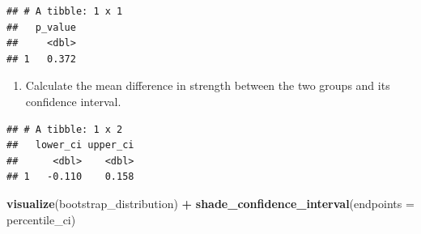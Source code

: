 \documentclass[
]{book}
\newenvironment{Shaded}{\begin{snugshade}}{\end{snugshade}}
\newcommand{\CommentTok}[1]{\textcolor[rgb]{0.56,0.35,0.01}{\textit{#1}}}
\newcommand{\DataTypeTok}[1]{\textcolor[rgb]{0.13,0.29,0.53}{#1}}
\newcommand{\DecValTok}[1]{\textcolor[rgb]{0.00,0.00,0.81}{#1}}
\newcommand{\FloatTok}[1]{\textcolor[rgb]{0.00,0.00,0.81}{#1}}
\newcommand{\KeywordTok}[1]{\textcolor[rgb]{0.13,0.29,0.53}{\textbf{#1}}}
\newcommand{\NormalTok}[1]{#1}
\newcommand{\OperatorTok}[1]{\textcolor[rgb]{0.81,0.36,0.00}{\textbf{#1}}}
\newcommand{\StringTok}[1]{\textcolor[rgb]{0.31,0.60,0.02}{#1}}
\providecommand{\tightlist}{%
  \setlength{\itemsep}{0pt}\setlength{\parskip}{0pt}}
\begin{document}
\begin{verbatim}
## # A tibble: 1 x 1
##   p_value
##     <dbl>
## 1   0.372
\end{verbatim}

\begin{enumerate}
\def\labelenumi{\arabic{enumi}.}
\setcounter{enumi}{3}
\tightlist
\item
  Calculate the mean difference in strength between the two groups and its confidence interval.
\end{enumerate}

\begin{Shaded}
\end{Shaded}

\begin{Shaded}
\end{Shaded}

\begin{verbatim}
## # A tibble: 1 x 2
##   lower_ci upper_ci
##      <dbl>    <dbl>
## 1   -0.110    0.158
\end{verbatim}

\begin{Shaded}
\begin{Highlighting}[]
\KeywordTok{visualize}\NormalTok{(bootstrap_distribution) }\OperatorTok{+}\StringTok{ }
\StringTok{  }\KeywordTok{shade_confidence_interval}\NormalTok{(}\DataTypeTok{endpoints =}\NormalTok{ percentile_ci)}
\end{Highlighting}
\end{Shaded}
\end{document}
